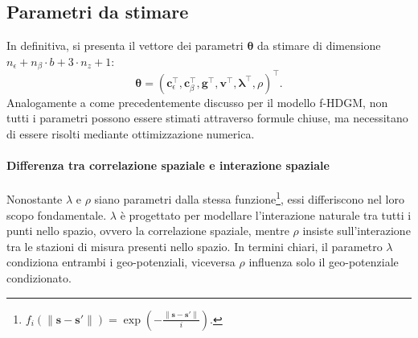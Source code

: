 \subsection[Parametri da stimare]{Parametri da stimare}
In definitiva, si presenta il vettore dei parametri $\boldsymbol{\theta}$ da stimare di dimensione $n_\epsilon + n_\beta\cdot b + 3\cdot n_z+1$:
\begin{equation}
	\boldsymbol{\theta} = (\mathbf{c}_\epsilon^\top, \mathbf{c}_\beta^\top, \mathbf{g}^\top, \mathbf{v}^\top, \boldsymbol{\lambda}^\top, \rho)^\top.
	\label{parametri_fp_HDGM}
\end{equation}
Analogamente a come precedentemente discusso per il modello f-HDGM, non tutti i parametri possono essere stimati attraverso formule chiuse, ma necessitano di essere risolti mediante ottimizzazione numerica.

\paragraph[Differenza tra correlazione spaziale e interazione spaziale]{Differenza tra correlazione spaziale e interazione spaziale} Nonostante $\lambda$ e $\rho$ siano parametri dalla stessa funzione\footnote{$f_i(\|\mathbf{s} - \mathbf{s}'\|)=\exp(-\frac{\|\mathbf{s} - \mathbf{s}'\|}{i})$.}, essi differiscono nel loro scopo fondamentale. $\lambda$ è progettato per modellare l'interazione naturale tra tutti i punti nello spazio, ovvero la correlazione spaziale, mentre $\rho$ insiste sull'interazione tra le stazioni di misura presenti nello spazio. 
In termini chiari, il parametro $\lambda$ condiziona entrambi i geo-potenziali, viceversa $\rho$ influenza solo il geo-potenziale condizionato.

